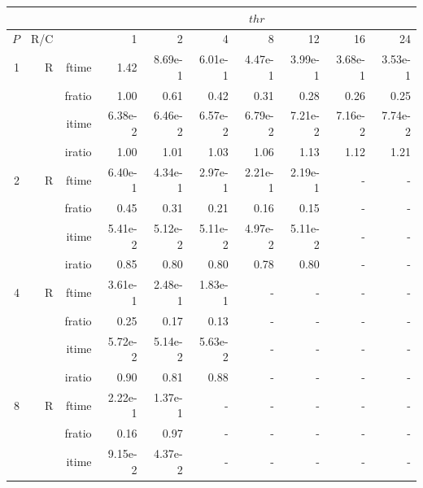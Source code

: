 \documentclass[a4paper]{article}
\begin{document}
\begin{table}[htbp]
\begin{center}
\begin{small}
\begin{tabular}{|r|r|r|r|r|r|r|r|r|r|}
\hline 
     & & & \multicolumn{7}{c|}{$thr$} \\ \hline
    $P$ & R/C &  & 1           & 2    & 4    & 8    & 12   & 16    & 24  \\ \hline\hline
   1 &  R &   ftime &    1.42  &    8.69e-1 &    6.01e-1 &    4.47e-1 &    3.99e-1 &    3.68e-1 &    3.53e-1 \\
             &             &  fratio &    1.00 &    0.61 &    0.42 &    0.31 &    0.28 &    0.26 &    0.25 \\
             &             &  itime &    6.38e-2 &    6.46e-2 &    6.57e-2 &    6.79e-2 &    7.21e-2 &    7.16e-2 &    7.74e-2 \\
             &             &  iratio &    1.00 &    1.01  &    1.03  &    1.06  &    1.13  &    1.12  &    1.21  \\\hline
   2 &  R &   ftime &    6.40e-1 &    4.34e-1 &    2.97e-1 &    2.21e-1 &    2.19e-1 &      - &      - \\
             &             &  fratio &    0.45 &   0.31 &   0.21 &    0.16 &    0.15 &      - &      - \\
             &             &  itime &    5.41e-2 &    5.12e-2 &    5.11e-2 &    4.97e-2 &    5.11e-2 &      - &      - \\
             &             &  iratio &    0.85 &    0.80 &    0.80 &    0.78 &    0.80 &      - &      - \\\hline
   4 &  R &   ftime &    3.61e-1 &    2.48e-1 &    1.83e-1 &      - &      - &      - &      - \\
             &             &  fratio &    0.25 &    0.17 &    0.13 &      - &      - &      - &      - \\
             &             &  itime &    5.72e-2 &    5.14e-2 &    5.63e-2 &      - &      - &      - &      - \\
             &             &  iratio &    0.90 &   0.81 &    0.88 &      - &      - &      - &      - \\\hline
   8 &   R &   ftime &    2.22e-1 &    1.37e-1 &      - &      - &      - &      - &      - \\
             &             &  fratio &    0.16 &   0.97 &     - &      - &      - &      - &      - \\
             &             &  itime &    9.15e-2 &    4.37e-2 &      - &      - &      - &      - &      - \\

\end{tabular}
\end{small}
\end{center}
\end{table}
\end{document}
